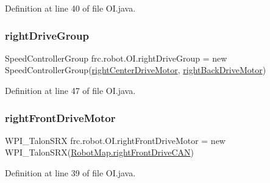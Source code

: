 Definition at line 40 of file O\+I.\+java.

\mbox{\label{classfrc_1_1robot_1_1OI_a1595c2b8ebd7e4e467027b2eb21983ee}} 
\subsubsection{\texorpdfstring{right\+Drive\+Group}{rightDriveGroup}}
{\footnotesize\ttfamily Speed\+Controller\+Group frc.\+robot.\+O\+I.\+right\+Drive\+Group = new Speed\+Controller\+Group(\hyperlink{classfrc_1_1robot_1_1OI_a9be3279c18d1f3433d6b07c706eb1457}{right\+Center\+Drive\+Motor}, \hyperlink{classfrc_1_1robot_1_1OI_a5f2937beffdc7dd1d937aaff36f20c1e}{right\+Back\+Drive\+Motor})\hspace{0.3cm}{\ttfamily [static]}}



Definition at line 47 of file O\+I.\+java.

\mbox{\label{classfrc_1_1robot_1_1OI_ae055ab4ea5a306737c950b1bfddf7352}} 
\subsubsection{\texorpdfstring{right\+Front\+Drive\+Motor}{rightFrontDriveMotor}}
{\footnotesize\ttfamily W\+P\+I\+\_\+\+Talon\+S\+RX frc.\+robot.\+O\+I.\+right\+Front\+Drive\+Motor = new W\+P\+I\+\_\+\+Talon\+S\+RX(\hyperlink{classfrc_1_1robot_1_1RobotMap_a4ca461a7ad91df180971974fd6abc236}{Robot\+Map.\+right\+Front\+Drive\+C\+AN})\hspace{0.3cm}{\ttfamily [static]}}



Definition at line 39 of file O\+I.\+java.

\mbox{\label{classfrc_1_1robot_1_1OI_a63a56e8585378f6afe6f45facc98f494}} 
